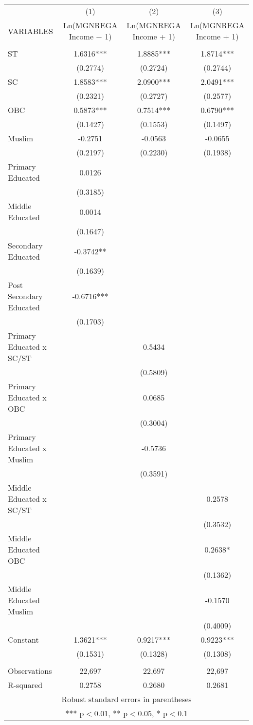 \documentclass[]{article}
\begin{document}
\begin{tabular}{lccc} \hline
 & (1) & (2) & (3) \\
VARIABLES & Ln(MGNREGA Income + 1) & Ln(MGNREGA Income + 1) & Ln(MGNREGA Income + 1) \\ \hline
 &  &  &  \\
ST & 1.6316*** & 1.8885*** & 1.8714*** \\
 & (0.2774) & (0.2724) & (0.2744) \\
SC & 1.8583*** & 2.0900*** & 2.0491*** \\
 & (0.2321) & (0.2727) & (0.2577) \\
OBC & 0.5873*** & 0.7514*** & 0.6790*** \\
 & (0.1427) & (0.1553) & (0.1497) \\
Muslim & -0.2751 & -0.0563 & -0.0655 \\
 & (0.2197) & (0.2230) & (0.1938) \\
Primary Educated & 0.0126 &  &  \\
 & (0.3185) &  &  \\
Middle Educated & 0.0014 &  &  \\
 & (0.1647) &  &  \\
Secondary Educated & -0.3742** &  &  \\
 & (0.1639) &  &  \\
Post Secondary Educated & -0.6716*** &  &  \\
 & (0.1703) &  &  \\
Primary Educated x SC/ST &  & 0.5434 &  \\
 &  & (0.5809) &  \\
Primary Educated x OBC &  & 0.0685 &  \\
 &  & (0.3004) &  \\
Primary Educated x Muslim &  & -0.5736 &  \\
 &  & (0.3591) &  \\
Middle Educated x SC/ST &  &  & 0.2578 \\
 &  &  & (0.3532) \\
Middle Educated OBC &  &  & 0.2638* \\
 &  &  & (0.1362) \\
Middle Educated Muslim &  &  & -0.1570 \\
 &  &  & (0.4009) \\
Constant & 1.3621*** & 0.9217*** & 0.9223*** \\
 & (0.1531) & (0.1328) & (0.1308) \\
 &  &  &  \\
Observations & 22,697 & 22,697 & 22,697 \\
 R-squared & 0.2758 & 0.2680 & 0.2681 \\ \hline
\multicolumn{4}{c}{ Robust standard errors in parentheses} \\
\multicolumn{4}{c}{ *** p$<$0.01, ** p$<$0.05, * p$<$0.1} \\
\end{tabular}
\end{document}
